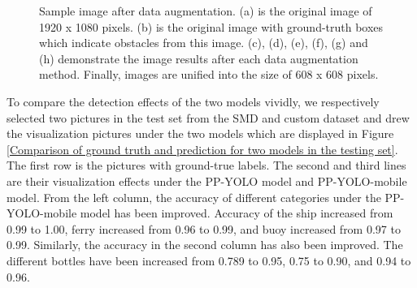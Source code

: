 \documentclass[sensors,article,submit,moreauthors,pdftex]{Definitions/mdpi}
\begin{document}
\begin{paracol}{2}
\begin{figure}[H]
{}
\quad
{}
\quad
{}
\quad
{}
\caption{Sample image after data augmentation. (a) is the original image of 1920 x 1080 pixels. (b) is the original image with ground-truth boxes which indicate obstacles from this image. (c), (d), (e), (f), (g) and (h) demonstrate the image results after each data augmentation method. Finally, images are unified into the size of 608 x 608 pixels.
}
\label{fig:data agumentation}
\end{figure}


To compare the detection effects of the two models vividly, we respectively selected two pictures in the test set from the SMD and custom dataset and drew the visualization pictures under the two models which are displayed in Figure \ref{Comparison of ground truth and prediction for two models in the testing set}. The first row is the pictures with ground-true labels. The second and third lines are their visualization effects under the PP-YOLO model and PP-YOLO-mobile model. 
From the left column, the accuracy of different categories under the PP-YOLO-mobile model has been improved. Accuracy of the ship increased from 0.99 to 1.00, ferry increased from 0.96 to 0.99, and buoy increased from 0.97 to 0.99.
Similarly, the accuracy in the second column has also been improved. The different bottles have been increased from 0.789 to 0.95, 0.75 to 0.90, and 0.94 to 0.96.


\end{paracol}
\end{document}
